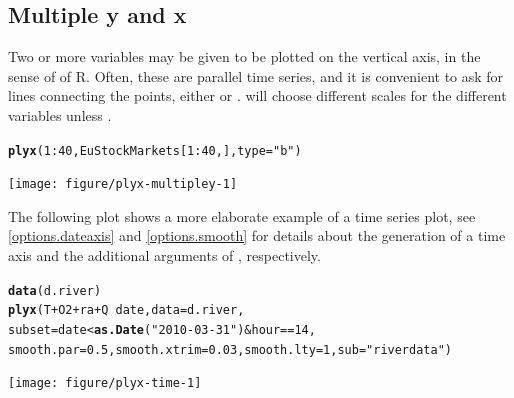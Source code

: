 \documentclass[11pt]{article}\usepackage[]{graphicx}\usepackage[]{color}
\makeatletter
\newcommand{\hlnum}[1]{\textcolor[rgb]{0.686,0.059,0.569}{#1}}%
\newcommand{\hlstr}[1]{\textcolor[rgb]{0.192,0.494,0.8}{#1}}%
\newcommand{\hlopt}[1]{\textcolor[rgb]{0,0,0}{#1}}%
\newcommand{\hlstd}[1]{\textcolor[rgb]{0.345,0.345,0.345}{#1}}%
\newcommand{\hlkwc}[1]{\textcolor[rgb]{0.333,0.667,0.333}{#1}}%
\newcommand{\hlkwd}[1]{\textcolor[rgb]{0.737,0.353,0.396}{\textbf{#1}}}%
\newenvironment{kframe}{%
 \def\at@end@of@kframe{}%
 \ifinner\ifhmode%
  \def\at@end@of@kframe{\end{minipage}}%
  \begin{minipage}{\columnwidth}%
 \fi\fi%
 \def\FrameCommand##1{\hskip\@totalleftmargin \hskip-\fboxsep
 \colorbox{shadecolor}{##1}\hskip-\fboxsep
     \hskip-\linewidth \hskip-\@totalleftmargin \hskip\columnwidth}%
 \MakeFramed {\advance\hsize-\width
   \@totalleftmargin\z@ \linewidth\hsize
   \@setminipage}}%
 {\par\unskip\endMakeFramed%
 \at@end@of@kframe}
\newenvironment{knitrout}{}{} %
\makeatother
\begin{document}
\subsection{Multiple y and x}
Two or more variables may be given to be plotted on the vertical axis,
in the sense of  of R.
Often, these are parallel time series, and it is convenient to ask for 
lines connecting the points, either  or .
 will choose different scales for the different variables unless
.

\begin{knitrout}
\color{fgcolor}\begin{kframe}
\begin{alltt}
\hlkwd{plyx}\hlstd{(}\hlnum{1}\hlopt{:}\hlnum{40}\hlstd{, EuStockMarkets[}\hlnum{1}\hlopt{:}\hlnum{40}\hlstd{,],} \hlkwc{type}\hlstd{=}\hlstr{"b"}\hlstd{)}
\end{alltt}
\end{kframe}
\texttt{[image: figure/plyx-multipley-1]} 

\end{knitrout}

The following plot shows a more elaborate example of a time series plot,
see \ref{options.dateaxis} and \ref{options.smooth}
for details about the generation of a time axis and
the additional arguments of , respectively.

\begin{knitrout}
\color{fgcolor}\begin{kframe}
\begin{alltt}
  \hlkwd{data}\hlstd{(d.river)}
  \hlkwd{plyx}\hlstd{(T}\hlopt{+}\hlstd{O2}\hlopt{+}\hlstd{ra}\hlopt{+}\hlstd{Q}\hlopt{~}\hlstd{date,} \hlkwc{data}\hlstd{=d.river,}
       \hlkwc{subset}\hlstd{=date}\hlopt{<}\hlkwd{as.Date}\hlstd{(}\hlstr{"2010-03-31"}\hlstd{)}\hlopt{&}\hlstd{hour}\hlopt{==}\hlnum{14}\hlstd{,}
       \hlkwc{smooth.par}\hlstd{=}\hlnum{0.5}\hlstd{,} \hlkwc{smooth.xtrim}\hlstd{=}\hlnum{0.03}\hlstd{,} \hlkwc{smooth.lty}\hlstd{=}\hlnum{1}\hlstd{,} \hlkwc{sub}\hlstd{=}\hlstr{"river data"}\hlstd{)}
\end{alltt}
\end{kframe}
\texttt{[image: figure/plyx-time-1]} 

\end{knitrout}
\end{document}
